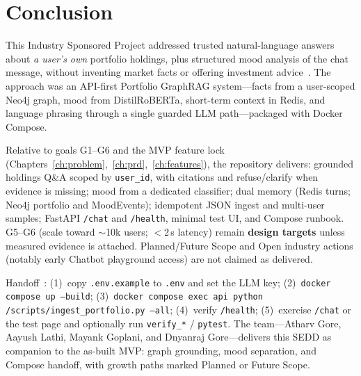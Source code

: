 \chapter{Conclusion}
\label{ch:conclusion}

This Industry Sponsored Project addressed trusted natural-language answers about \emph{a user's own} portfolio holdings, plus structured mood analysis of the chat message, without inventing market facts or offering investment advice~\cite{prd}. The approach was an API-first Portfolio GraphRAG system---facts from a user-scoped Neo4j graph, mood from DistilRoBERTa, short-term context in Redis, and language phrasing through a single guarded LLM path---packaged with Docker Compose.

Relative to goals G1--G6 and the MVP feature lock (Chapters~\ref{ch:problem},~\ref{ch:prd},~\ref{ch:features}), the repository delivers: grounded holdings Q\&A scoped by \texttt{user\_id}, with citations and refuse/clarify when evidence is missing; mood from a dedicated classifier; dual memory (Redis turns; Neo4j portfolio and MoodEvents); idempotent JSON ingest and multi-user samples; FastAPI \texttt{/chat} and \texttt{/health}, minimal test UI, and Compose runbook. G5--G6 (scale toward $\sim$10k users; $<$2\,s latency) remain \textbf{design targets} unless measured evidence is attached. Planned/Future Scope and Open industry actions (notably early Chatbot playground access) are not claimed as delivered.

Handoff~\cite{readme}: (1)~copy \texttt{.env.example} to \texttt{.env} and set the LLM key; (2)~\texttt{docker compose up --build}; (3)~\texttt{docker compose exec api python /scripts/ingest\_portfolio.py --all}; (4)~verify \texttt{/health}; (5)~exercise \texttt{/chat} or the test page and optionally run \texttt{verify\_*} / \texttt{pytest}. The team---Atharv Gore, Aayush Lathi, Mayank Goplani, and Dnyanraj Gore---delivers this SEDD as companion to the as-built MVP: graph grounding, mood separation, and Compose handoff, with growth paths marked Planned or Future Scope.
